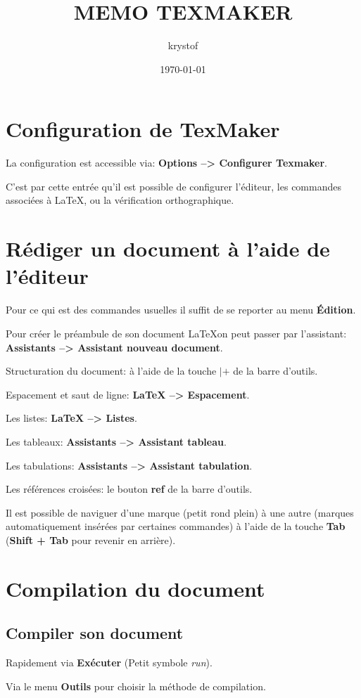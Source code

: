 \documentclass[a4paper,11pt]{article}
\title{MEMO TEXMAKER}
\author{krystof}
\date{\today}
\begin{document}
\maketitle
\section{Configuration de \textbf{TexMaker}}
La configuration est accessible via: \textbf{Options --> Configurer Texmaker}.

C'est par cette entrée qu'il est possible de configurer l'éditeur, les commandes associées à \LaTeX, ou la vérification orthographique.

\section{Rédiger un document à l'aide de l'éditeur}
Pour ce qui est des commandes usuelles il suffit de se reporter au menu \textbf{Édition}.

Pour créer le préambule de son document \LaTeX on peut passer par l'assistant: \textbf{Assistants --> Assistant nouveau document}.

Structuration du document: à l'aide de la touche \textbf{$|+$} de la barre d'outils.

Espacement et saut de ligne: \textbf{LaTeX --> Espacement}.

Les listes: \textbf{LaTeX --> Listes}.

Les tableaux: \textbf{Assistants --> Assistant tableau}.

Les tabulations: \textbf{Assistants --> Assistant tabulation}.

Les références croisées: le bouton \textbf{ref} de la barre d'outils.

Il est possible de naviguer d'une marque (petit rond plein) à une autre (marques  automatiquement insérées par certaines commandes) à l'aide de la touche \textbf{Tab} (\textbf{Shift + Tab} pour revenir en arrière).

\section{Compilation du document}
\subsection*{Compiler son document}
Rapidement via \textbf{Exécuter} (Petit symbole \textit{run}).

Via le menu \textbf{Outils} pour choisir la méthode de compilation.
\end{document}
